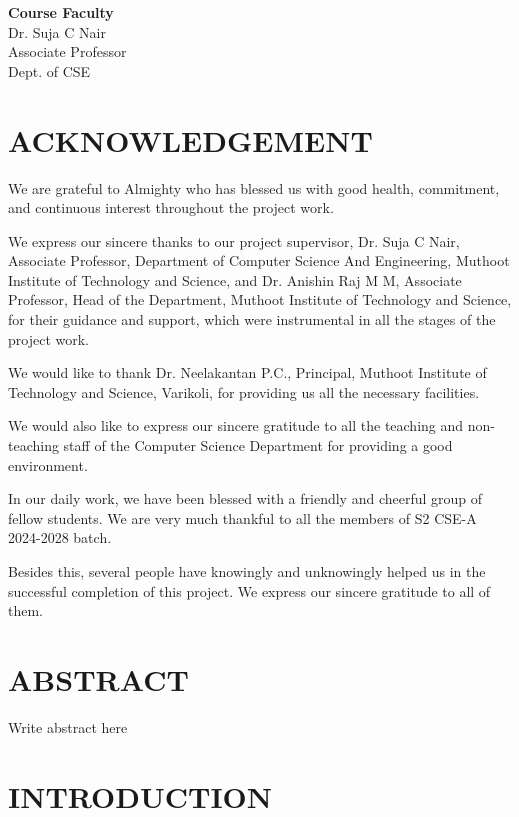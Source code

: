 \documentclass[a4paper,12pt]{report}
\begin{document}
\textbf{Course Faculty} \\ 
Dr. Suja C Nair \\
Associate Professor \\
Dept. of CSE

\newpage


\chapter*{ACKNOWLEDGEMENT}

We are grateful to Almighty who has blessed us with good health, commitment, and continuous interest throughout the project work.

We express our sincere thanks to our project supervisor, Dr. Suja C Nair, Associate Professor, Department of Computer Science And Engineering, Muthoot Institute of Technology and Science, and Dr. Anishin Raj M M, Associate Professor, Head of the Department, Muthoot Institute of Technology and Science, for their guidance and support, which were instrumental in all the stages of the project work.

We would like to thank Dr. Neelakantan P.C., Principal, Muthoot Institute of Technology and Science, Varikoli, for providing us all the necessary facilities.

We would also like to express our sincere gratitude to all the teaching and non-teaching staff of the Computer Science Department for providing a good environment.

In our daily work, we have been blessed with a friendly and cheerful group of fellow students. We are very much thankful to all the members of S2 CSE-A 2024-2028 batch.

Besides this, several people have knowingly and unknowingly helped us in the successful completion of this project. We express our sincere gratitude to all of them.

\newpage

\chapter*{ABSTRACT}
Write abstract here

\newpage

\tableofcontents
\newpage



\chapter{INTRODUCTION}
\end{document}
